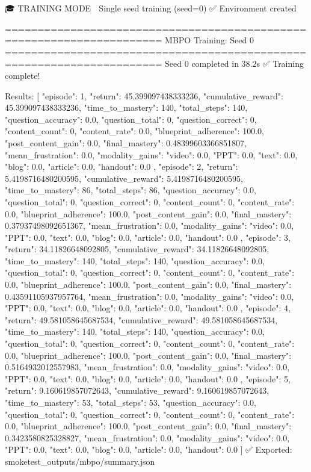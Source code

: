 🎓 TRAINING MODE
📍 Single seed training (seed=0)
✅ Environment created

======================================================================
MBPO Training: Seed 0
======================================================================
Seed 0 completed in 38.2s
✅ Training complete!

Results: [
  {
    "episode": 1,
    "return": 45.399097438333236,
    "cumulative_reward": 45.399097438333236,
    "time_to_mastery": 140,
    "total_steps": 140,
    "question_accuracy": 0.0,
    "question_total": 0,
    "question_correct": 0,
    "content_count": 0,
    "content_rate": 0.0,
    "blueprint_adherence": 100.0,
    "post_content_gain": 0.0,
    "final_mastery": 0.48399603366851807,
    "mean_frustration": 0.0,
    "modality_gains": {
      "video": 0.0,
      "PPT": 0.0,
      "text": 0.0,
      "blog": 0.0,
      "article": 0.0,
      "handout": 0.0
    }
  },
  {
    "episode": 2,
    "return": 5.4198716480200595,
    "cumulative_reward": 5.4198716480200595,
    "time_to_mastery": 86,
    "total_steps": 86,
    "question_accuracy": 0.0,
    "question_total": 0,
    "question_correct": 0,
    "content_count": 0,
    "content_rate": 0.0,
    "blueprint_adherence": 100.0,
    "post_content_gain": 0.0,
    "final_mastery": 0.37937498092651367,
    "mean_frustration": 0.0,
    "modality_gains": {
      "video": 0.0,
      "PPT": 0.0,
      "text": 0.0,
      "blog": 0.0,
      "article": 0.0,
      "handout": 0.0
    }
  },
  {
    "episode": 3,
    "return": 34.11826648092805,
    "cumulative_reward": 34.11826648092805,
    "time_to_mastery": 140,
    "total_steps": 140,
    "question_accuracy": 0.0,
    "question_total": 0,
    "question_correct": 0,
    "content_count": 0,
    "content_rate": 0.0,
    "blueprint_adherence": 100.0,
    "post_content_gain": 0.0,
    "final_mastery": 0.43591105937957764,
    "mean_frustration": 0.0,
    "modality_gains": {
      "video": 0.0,
      "PPT": 0.0,
      "text": 0.0,
      "blog": 0.0,
      "article": 0.0,
      "handout": 0.0
    }
  },
  {
    "episode": 4,
    "return": 49.581058645687534,
    "cumulative_reward": 49.581058645687534,
    "time_to_mastery": 140,
    "total_steps": 140,
    "question_accuracy": 0.0,
    "question_total": 0,
    "question_correct": 0,
    "content_count": 0,
    "content_rate": 0.0,
    "blueprint_adherence": 100.0,
    "post_content_gain": 0.0,
    "final_mastery": 0.5164932012557983,
    "mean_frustration": 0.0,
    "modality_gains": {
      "video": 0.0,
      "PPT": 0.0,
      "text": 0.0,
      "blog": 0.0,
      "article": 0.0,
      "handout": 0.0
    }
  },
  {
    "episode": 5,
    "return": 9.160619857072643,
    "cumulative_reward": 9.160619857072643,
    "time_to_mastery": 53,
    "total_steps": 53,
    "question_accuracy": 0.0,
    "question_total": 0,
    "question_correct": 0,
    "content_count": 0,
    "content_rate": 0.0,
    "blueprint_adherence": 100.0,
    "post_content_gain": 0.0,
    "final_mastery": 0.3423580825328827,
    "mean_frustration": 0.0,
    "modality_gains": {
      "video": 0.0,
      "PPT": 0.0,
      "text": 0.0,
      "blog": 0.0,
      "article": 0.0,
      "handout": 0.0
    }
  }
]
✅ Exported: smoketest_outputs/mbpo/summary.json

